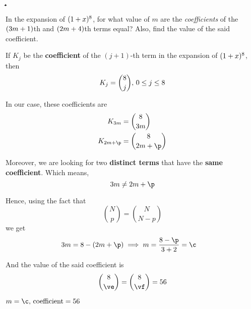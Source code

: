 



\SUBTRACT{}\p
\ADD\va\vb\a
\SUBTRACT\vd\p\b
\DIVIDE\b\a\c
\MULTIPLY\c\va\ve
\SUBTRACT\vd\ve\vf

\question[3] In the expansion of $(1+x)^{8}$, for what value of $m$ are 
the \textit{coefficients} of the $(3 m + 1)$th and $(2 m + 4)$th terms equal?
Also, find the value of the said coefficient.

\watchout

\begin{solution}[\halfpage]
  If $K_j$ be the  \textbf{coefficient} of the $(j+1)$-th term in the expansion of $(1+x)^{8}$, then
  \[ K_j = \binom{8}{j},\, 0\leq j\leq8 \] 
  
  In our case, these coefficients are  
  \begin{align}
    K_{\va m} &= \binom\vd{\va m} \\
    K_{\vb m + \p} &= \binom\vd{\vb m + \p}
  \end{align}
  
  Moreover, we are looking for two \textbf{distinct terms} that have the \textbf{same coefficient}. Which means, 
   \[ \va m \neq \vb m + \p \]
  
  Hence, using the fact that 
  \[ \binom{N}{p} = \binom{N}{N-p} \]
  we get  
  \begin{align}
    \va m &= \vd - (\vb m + \p) \implies m = \dfrac{\vd - \p}{\va + \vb} = \c
  \end{align}

  And the value of the said coefficient is 
  \[ \binom\vd\ve = \binom\vd\vf = \vg \] 
\end{solution}

\ifprintanswers
  \begin{codex}
    $m=\c,\,\text{coefficient} =\vg$
  \end{codex}
\fi 

